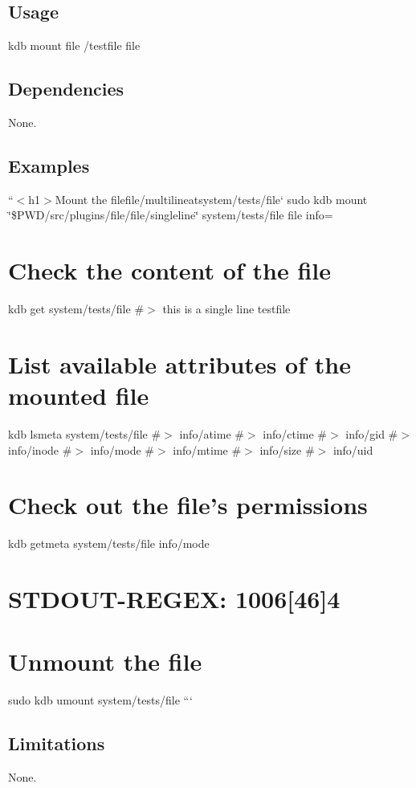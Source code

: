 \subsection*{Usage}

{\ttfamily kdb mount file /testfile file}

\subsection*{Dependencies}

None.

\subsection*{Examples}

``{\ttfamily  $<$h1$>$Mount the file}file/multiline{\ttfamily at}system/tests/file` sudo kdb mount \char`\"{}\$\+P\+W\+D/src/plugins/file/file/singleline\char`\"{} system/tests/file file info=

\section*{Check the content of the file}

kdb get system/tests/file \#$>$ this is a single line testfile

\section*{List available attributes of the mounted file}

kdb lsmeta system/tests/file \#$>$ info/atime \#$>$ info/ctime \#$>$ info/gid \#$>$ info/inode \#$>$ info/mode \#$>$ info/mtime \#$>$ info/size \#$>$ info/uid

\section*{Check out the file’s permissions}

kdb getmeta system/tests/file info/mode \section*{S\+T\+D\+O\+U\+T-\/\+R\+E\+G\+EX\+: 1006\mbox{[}46\mbox{]}4}

\section*{Unmount the file}

sudo kdb umount system/tests/file ```

\subsection*{Limitations}

None. 